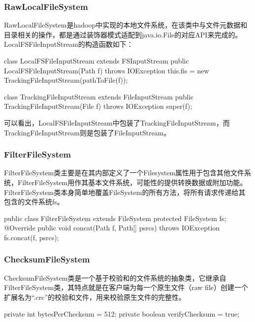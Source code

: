     \subsubsection{RawLocalFileSystem}
        RawLocalFileSystem是hadoop中实现的本地文件系统，在该类中与文件元数据和目录相关的操作，都是通过装饰器模式适配到java.io.File的对应API来完成的。\\
        LocalFSFileInputStream的构造函数如下：
        \begin{java}[caption=LocalFSFileInputStream]
class LocalFSFileInputStream extends FSInputStream {
    public LocalFSFileInputStream(Path f) throws IOException {
        this.fis = new TrackingFileInputStream(pathToFile(f));
    }
}
        \end{java}
        \begin{java}[caption=TrackingFileInputStream]
class TrackingFileInputStream extends FileInputStream {
    public TrackingFileInputStream(File f) throws IOException {
        super(f);
    }
}
        \end{java}
    可以看出，LocalFSFileInputStream中包装了TrackingFileInputStream，而TrackingFileInputStream则是包装了FileInputStream。

    \subsubsection{FilterFileSystem}
        FilterFileSystem类主要是在其内部定义了一个Filesystem属性用于包含其他文件系统，FilterFileSystem用作其基本文件系统，可能性的提供转换数据或附加功能。\\
        FilterFileSystem类本身简单地覆盖FileSystem的所有方法，将所有请求传递给其包含的文件系统fs。
        \begin{java}[caption=FilterFileSystem]
public class FilterFileSystem extends FileSystem {
    protected FileSystem fs;
    @Override
    public void concat(Path f, Path[] psrcs) throws IOException {
        fs.concat(f, psrcs);
    }
}
        \end{java}

    \subsubsection{ChecksumFileSystem}
        ChecksumFileSystem类是一个基于校验和的文件系统的抽象类，它继承自FilterFileSystem类，其特点就是在客户端为每一个原生文件（raw file）创建一个扩展名为“.crc”的校验和文件，用来校验原生文件的完整性。
        \begin{java}[caption=ChecksumFileSystem]
private int bytesPerChecksum = 512; 
private boolean verifyChecksum = true; 
        \end{java}
        
